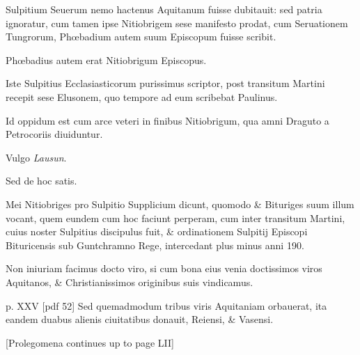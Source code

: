 \begin{parnumbers}
Sulpitium Seuerum
nemo hactenus Aquitanum fuisse dubitauit: sed patria ignoratur,
cum tamen ipse Nitiobrigem sese manifesto prodat, cum Seruationem
Tungrorum, Phœbadium autem suum Episcopum fuisse scribit.

Phœbadius autem erat Nitiobrigum Episcopus.

Iste Sulpitius
Ecclasiasticorum purissimus scriptor, post transitum Martini recepit
sese Elusonem, quo tempore ad eum scribebat Paulinus.

Id oppidum est cum arce veteri in finibus Nitiobrigum, qua amni Draguto
a Petrocoriis diuiduntur.

Vulgo \textit{Lausun}.

Sed de hoc satis.

Mei
Nitiobriges pro Sulpitio Supplicium dicunt, quomodo \& Bituriges
suum illum vocant, quem eundem cum hoc faciunt perperam,
cum inter transitum Martini, cuius noster Sulpitius discipulus fuit,
\& ordinationem Sulpitij Episcopi Bituricensis sub Guntchramno
Rege, intercedant plus minus anni 190.

Non iniuriam facimus
docto viro, si cum bona eius venia doctissimos viros Aquitanos,
\& Christianissimos originibus suis vindicamus.

\clearpage
p. XXV [pdf 52]
Sed quemadmodum tribus viris Aquitaniam orbauerat, ita eandem duabus
alienis ciuitatibus donauit, Reiensi, \& Vasensi.

[Prolegomena continues up to page LII]

\end{parnumbers}
